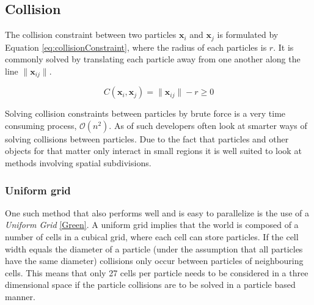 \subsection{Collision}

The collision constraint between two particles $ \mathbf{x}_{i} $ and $ \mathbf{x}_{j} $ is formulated by Equation \ref{eq:collisionConstraint}, where the radius of each particles is $ r $. It is commonly solved by translating each particle away from one another along the line $ \| \mathbf{x}_{ij} \| $.

\begin{equation} \label{eq:collisionConstraint}
  C(\mathbf{x}_{i}, \mathbf{x}_{j}) = \| \mathbf{x}_{ij} \| - r \geq 0 
\end{equation}

Solving collision constraints between particles by brute force is a very time consuming process, $\mathcal{O}(n^{2})$. As of such developers often look at smarter ways of solving collisions between particles. Due to the fact that particles and other objects for that matter only interact in small regions it is well suited to look at methods involving spatial subdivisions. 

\subsubsection{Uniform grid}

One such method that also performs well and is easy to parallelize is the use of a \textit{Uniform Grid} \ref{Green}. A uniform grid implies that the world is composed of a number of cells in a cubical grid, where each cell can store particles. If the cell width equals the diameter of a particle (under the assumption that all particles have the same diameter) collisions only occur between particles of neighbouring cells. This means that only 27 cells per particle needs to be considered in a three dimensional space if the particle collisions are to be solved in a particle based manner.